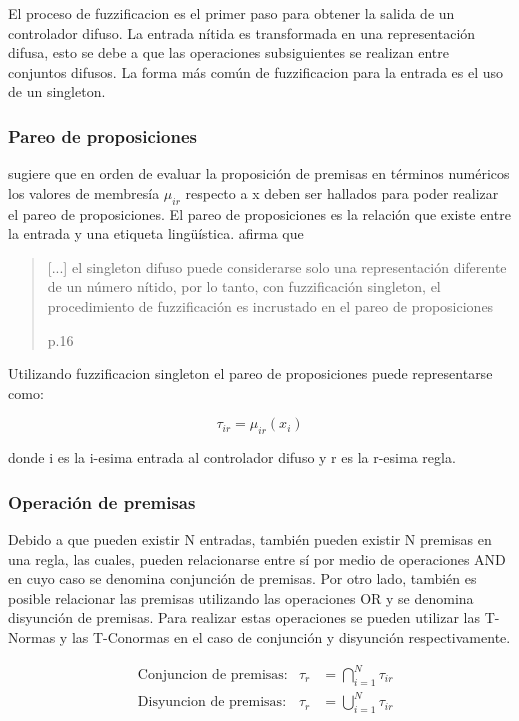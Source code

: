             El proceso de fuzzificacion es el primer paso para obtener la salida de un controlador difuso. La entrada nítida es transformada en una representación difusa, esto se debe a que las operaciones subsiguientes se realizan entre conjuntos difusos. La forma más común de fuzzificacion para la entrada es el uso de un singleton.
            
        \subsubsection{Pareo de proposiciones}
            
            \textcite{riid2003transparent} sugiere que en orden de evaluar la proposición de premisas en términos numéricos los valores de membresía $\mu_{ir}$ respecto a x deben ser hallados para poder realizar el pareo de proposiciones. El pareo de proposiciones es la relación que existe entre la entrada y una etiqueta lingüística. \textcite{riid2003transparent} afirma que \blockquote[p.16]{[...] el singleton difuso puede considerarse solo una representación diferente de un número nítido, por lo tanto, con fuzzificación singleton, el procedimiento de fuzzificación es incrustado en el pareo de proposiciones}. Utilizando fuzzificacion singleton el pareo de proposiciones puede representarse como:

            \begin{equation}\label{eq:preposiciones}
                \tau_{ir} = \mu_{ir}(x_i)
            \end{equation}

            \noindent donde i es la i-esima entrada al controlador difuso y r es la r-esima regla.
            
        \subsubsection{Operación de premisas}
            
            Debido a que pueden existir N entradas, también pueden existir N premisas en una regla, las cuales, pueden relacionarse entre sí por medio de operaciones AND en cuyo caso se denomina conjunción de premisas. Por otro lado, también es posible relacionar las premisas utilizando las operaciones OR y se denomina disyunción de premisas. Para realizar estas operaciones se pueden utilizar las T-Normas y las T-Conormas en el caso de conjunción y disyunción respectivamente.

            \begin{align}
                &\text{Conjuncion de premisas:} & \tau_{r} &= \bigcap_{i=1}^{N}\tau_{ir} \label{eq:conjP} \\
                &\text{Disyuncion de premisas:} & \tau_{r} &= \bigcup_{i=1}^{N}\tau_{ir} \label{eq:disyP}
            \end{align}

